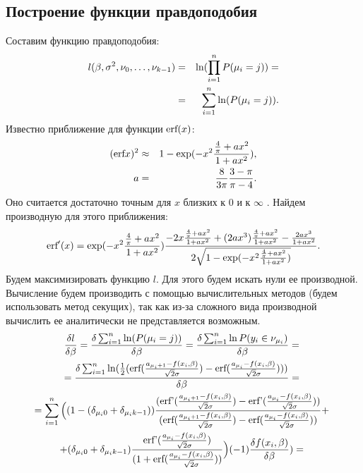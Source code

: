 \documentclass[a4paper,14pt]{extarticle}
\begin{document}
\subsection{Построение функции правдоподобия}\label{sec4_1}
Составим функцию правдоподобия:
\begin{eqnarray}
    \label{eq22}l(\beta,\sigma^2, \nu_0,\dots, \nu_{k-1})&=&\textup{ln}(\prod_{i=1}^{n}P(\mu_i=j))=\\
    \label{eq23}&=&\sum_{i=1}^{n}\ln(P(\mu_i=j)).
\end{eqnarray}
Известно приближение для функции $\textup{erf}(x)$:
\begin{eqnarray}
    \label{eq24}(\textup{erf} x)^2&\approx& 1- \exp(-x^2 \frac{\frac{4}{\pi}+ax^2}{1+ax^2}),\\
    \nonumber a&=&\frac{8}{3\pi}\frac{3-\pi}{\pi -4}.
\end{eqnarray}
Оно считается достаточно точным для $x$ близких к $0$ и к $\infty$ \cite{Winitzki}. \hfill\break
Найдем производную для этого приближения:
\begin{eqnarray}
    \label{eq26}\textup{erf}'(x) = \exp(-x^2 \frac{\frac{4}{\pi}+ax^2}{1+ax^2}) \frac{-2x\frac{\frac{4}{\pi}+ax^2}{1+ax^2}+(2ax^3)\frac{\frac{4}{\pi}+ax^2}{1+ax^2}-\frac{2ax^3}{1+ax^2}}{2\sqrt{1- \exp(-x^2 \frac{\frac{4}{\pi}+ax^2}{1+ax^2})}}.
\end{eqnarray}
Будем максимизировать функцию $l$.
Для этого будем искать нули ее производной. Вычисление будем производить с помощью вычислительных методов (будем использовать метод секущих), так как из-за сложного
вида производной вычислить ее аналитически не представляется возможным.
\begin{multline}
    \label{eq27}\frac{\delta l}{\delta \beta}=\frac{\delta \sum_{i=1}^{n}\ln(P(\mu_i=j))}{\delta \beta}=\frac{\delta \sum_{i=1}^{n}\ln P(y_i\in \nu_{\mu_i})}{\delta \beta}=~\\
    =\frac{\delta \sum_{i=1}^{n} \ln(\frac{1}{2}(\textup{erf}(\frac{a_{\mu_i+1}-f(x_i,\beta)}{\sqrt{2}\sigma})-\textup{erf}(\frac{a_{\mu_i}-f(x_i,\beta)}{\sqrt{2}\sigma})) )         }{\delta \beta}=~\\
    =  \sum_{i=1}^{n}\Big((1-(\delta_{\mu_i 0}+\delta_{\mu_i k-1}))\frac{(\textup{erf'}(\frac{a_{\mu_i+1}-f(x_i,\beta)}{\sqrt{2}\sigma})-\textup{erf'}(\frac{a_{\mu_i}-f(x_i,\beta)}{\sqrt{2}\sigma}))}{ (\textup{erf}(\frac{a_{\mu_i+1}-f(x_i,\beta)}{\sqrt{2}\sigma})-\textup{erf}(\frac{a_{\mu_i}-f(x_i,\beta)}{\sqrt{2}\sigma}))}+~\\
    +(\delta_{\mu_i 0}+\delta_{\mu_i k-1})\frac{\textup{erf'}(\frac{a_{\mu_i}-f(x_i,\beta)}{\sqrt{2}\sigma})}{(1+\textup{erf}(\frac{a_{\mu_i}-f(x_i,\beta)}{\sqrt{2}\sigma}))}\Big)  (-1) \frac{\delta f(x_i,\beta)}{\delta \beta} )=~
\end{multline}
\end{document}
